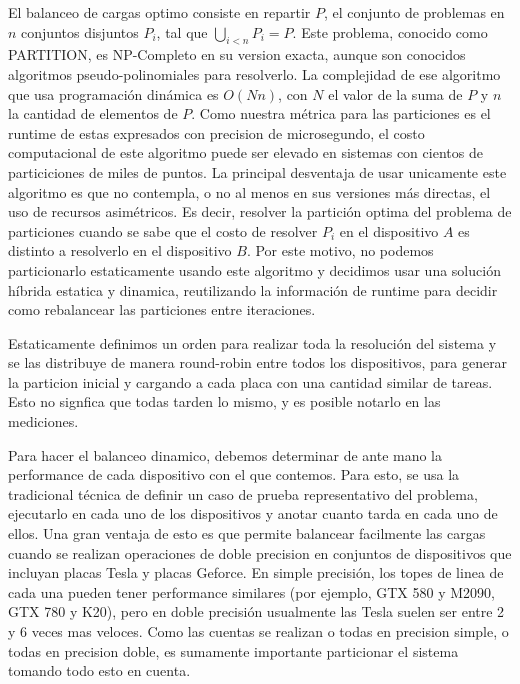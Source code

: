 El balanceo de cargas optimo consiste en repartir $P$, el conjunto de problemas en
$n$ conjuntos disjuntos $P_i$, tal que $\bigcup_{i<n} P_i = P$. Este problema, conocido como PARTITION,
es NP-Completo en su version exacta, aunque son conocidos algoritmos pseudo-polinomiales para resolverlo.
La complejidad de ese algoritmo que usa programaci\'on din\'amica es $O(Nn)$, con $N$ el valor
de la suma de $P$ y $n$ la cantidad de elementos de $P$. Como nuestra m\'etrica para las
particiones es el runtime de estas expresados con precision de microsegundo, el costo computacional
de este algoritmo puede ser elevado en sistemas con cientos de particiciones de miles de puntos.
La principal desventaja de usar unicamente este algoritmo es que no contempla, o no al menos
en sus versiones m\'as directas, el uso de recursos asim\'etricos. Es decir, resolver la partici\'on
optima del problema de particiones cuando se sabe que el costo de resolver $P_i$ en el dispositivo
$A$ es distinto a resolverlo en el dispositivo $B$. Por este motivo, no podemos particionarlo estaticamente
usando este algoritmo y decidimos usar una soluci\'on h\'ibrida estatica y dinamica, reutilizando
la informaci\'on de runtime para decidir como rebalancear las particiones entre iteraciones.

Estaticamente definimos un orden para realizar toda la resoluci\'on del sistema y
se las distribuye de manera round-robin entre todos los dispositivos, para generar la
particion inicial y cargando a cada placa con una cantidad similar de tareas. Esto no signfica
que todas tarden lo mismo, y es posible notarlo en las mediciones.

Para hacer el balanceo dinamico, debemos determinar de ante mano la performance de cada
dispositivo con el que contemos. Para esto, se usa la tradicional t\'ecnica de definir un
caso de prueba representativo del problema, ejecutarlo en cada uno de los dispositivos y anotar
cuanto tarda en cada uno de ellos. Una gran ventaja de esto es que permite balancear facilmente las
cargas cuando se realizan operaciones de doble precision en conjuntos de dispositivos que incluyan
placas Tesla y placas Geforce. En simple precisi\'on, los topes de linea de cada una pueden tener
performance similares (por ejemplo, GTX 580 y M2090, GTX 780 y K20), pero en doble precisi\'on
usualmente las Tesla suelen ser entre 2 y 6 veces mas veloces. Como las cuentas se realizan
o todas en precision simple, o todas en precision doble, es sumamente importante particionar el
sistema tomando todo esto en cuenta.

